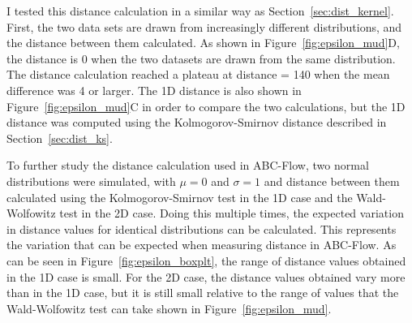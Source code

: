 I tested this distance calculation in a similar way as Section~\ref{sec:dist_kernel}. First, the two data sets are drawn from increasingly different distributions, and the distance between them calculated. As shown in Figure~\ref{fig:epsilon_mud}D, the distance is 0 when the two datasets are drawn from the same distribution. The distance calculation reached a plateau at distance = 140 when the mean difference was 4 or larger. The 1D distance is also shown in Figure~\ref{fig:epsilon_mud}C in order to compare the two calculations, but the 1D distance was computed using the Kolmogorov-Smirnov distance described in Section~\ref{sec:dist_ks}.

To further study the distance calculation used in ABC-Flow, two normal distributions were simulated, with $\mu=0$ and $\sigma=1$ and distance between them calculated using the Kolmogorov-Smirnov test in the 1D case and the Wald-Wolfowitz test in the 2D case. Doing this multiple times, the expected variation in distance values for identical distributions can be calculated. This represents the variation that can be expected when measuring distance in ABC-Flow. As can be seen in Figure~\ref{fig:epsilon_boxplt}, the range of distance values obtained in the 1D case is small. For the 2D case, the distance values obtained vary more than in the 1D case, but it is still small relative to the range of values that the Wald-Wolfowitz test can take shown in Figure~\ref{fig:epsilon_mud}. 


